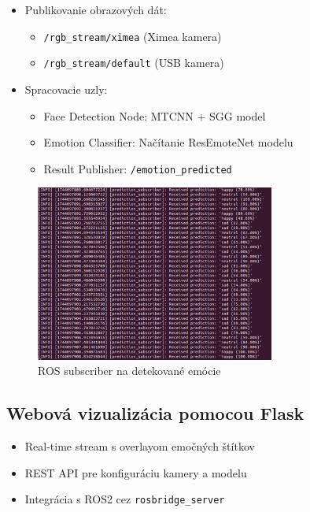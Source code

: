 \begin{itemize}
\item Publikovanie obrazových dát:
  \begin{itemize}
  \item \texttt{/rgb\_stream/ximea} (Ximea kamera)
  \item \texttt{/rgb\_stream/default} (USB kamera)
  \end{itemize}
\item Spracovacie uzly:
  \begin{itemize}
  \item Face Detection Node: MTCNN + SGG model
  \item Emotion Classifier: Načítanie ResEmoteNet modelu
  \item Result Publisher: \texttt{/emotion\_predicted}
  \end{itemize}
\end{itemize}
\begin{figure}[!htpb]
    \centering
    \includegraphics[width=0.7\textwidth]{img/subscriber.png}
    \caption{ROS subscriber na detekované emócie}
    \label{fig:ros2_architecture}
\end{figure}

\subsection{Webová vizualizácia pomocou Flask}
\begin{itemize}
\item Real-time stream s overlayom emočných štítkov
\item REST API pre konfiguráciu kamery a modelu
\item Integrácia s ROS2 cez \texttt{rosbridge\_server}
\end{itemize}

